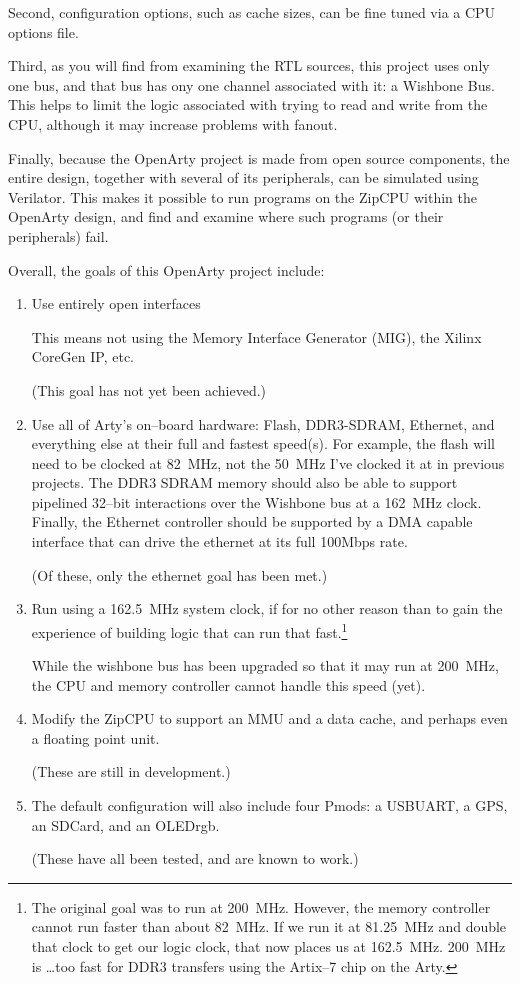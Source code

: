 \documentclass{gqtekspec}
\begin{document}
Second, configuration options, such as cache sizes, can be fine tuned via a 
CPU options file.

Third, as you will find from examining the RTL sources, this project uses only
one bus, and that bus has ony one channel associated with it: a Wishbone Bus.
This helps to limit the logic associated with trying to read and write from
the CPU, although it may increase problems with fanout.

Finally, because the OpenArty project is made from open source components, the
entire design, together with several of its peripherals, can be simulated using
Verilator.  This makes it possible to run programs on the ZipCPU within the
OpenArty design, and find and examine where such programs (or their peripherals)
fail.

Overall, the goals of this OpenArty project include:
\begin{enumerate}
\item Use entirely open interfaces

	This means not using the Memory Interface Generator (MIG), the
	Xilinx CoreGen IP, etc. 

	(This goal has not yet been achieved.)

\item Use all of Arty's on--board hardware: Flash, DDR3-SDRAM, Ethernet, and
	everything else at their full and fastest speed(s).  For example, the
	flash will need to be clocked at 82~MHz, not the 50~MHz I've clocked
	it at in previous projects.  The DDR3 SDRAM memory should also be able
	to support pipelined 32--bit interactions over the Wishbone bus at a
	162~MHz clock.  Finally, the Ethernet controller should be supported
	by a DMA capable interface that can drive the ethernet at its full
	100Mbps rate.

	(Of these, only the ethernet goal has been met.)

\item Run using a 162.5~MHz system clock, if for no other reason than to gain
	the experience of building logic that can run that fast.\footnote{The
	original goal was to run at 200~MHz.  However, the memory controller
	cannot run faster than about 82~MHz.  If we run it at 81.25~MHz and
	double that clock to get our logic clock, that now places us at
	162.5~MHz.  200~MHz is \ldots too fast for DDR3 transfers using the
	Artix--7 chip on the Arty.}

	While the wishbone bus has been upgraded so that it may run at 
	200~MHz, the CPU and memory controller cannot handle this speed (yet).

\item Modify the ZipCPU to support an MMU and a data cache, and perhaps even
	a floating point unit.

	(These are still in development.)

\item The default configuration will also include four Pmods: a USBUART,
	a GPS, an SDCard, and an OLEDrgb.

	(These have all been tested, and are known to work.)
\end{enumerate}
\end{document}
